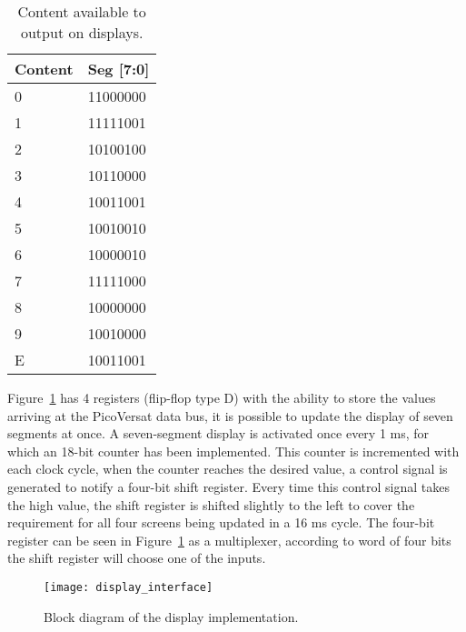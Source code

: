 \vspace{10pt}
\begin{table}[!htbp]
\centering
    \begin{tabular}{|l|l|}
    \hline
    \textbf{Content} & \textbf{Seg {[}7:0{]}} \\ \hline
    0               & 11000000               \\ \hline
    1               & 11111001               \\ \hline
    2               & 10100100               \\ \hline
    3               & 10110000               \\ \hline
    4               & 10011001               \\ \hline
    5               & 10010010               \\ \hline
    6               & 10000010               \\ \hline
    7               & 11111000               \\ \hline
    8               & 10000000               \\ \hline
    9               & 10010000               \\ \hline
    E               & 10011001               \\ \hline
    \end{tabular}
    \caption{Content available to output on displays.}
    \label{tab:disp_values}
\end{table}

\clearpage
\noindent Figure~\ref{fig:display_interface} has 4 registers (flip-flop type D) with the ability to store the values
arriving at the PicoVersat data bus, it is possible to update the display of seven segments at once.
A seven-segment display is activated once every 1 ms, for which an 18-bit counter has been implemented.
This counter is incremented with each clock cycle, when the counter reaches the desired value, a control signal is
generated to notify a four-bit shift register. Every time this control signal takes the high value, the shift register is
shifted slightly to the left to cover the requirement for all four screens being updated in a 16 ms cycle.
The four-bit register can be seen in Figure~\ref{fig:display_interface} as a multiplexer, according to
word of four bits the shift register will choose one of the inputs.

\vspace{10pt}
\begin{figure}[!htbp]
    \centerline{\texttt{[image: display\_interface]}}
    \vspace{0cm}\caption{Block diagram of the display implementation.}
    \label{fig:display_interface}
\end{figure}

